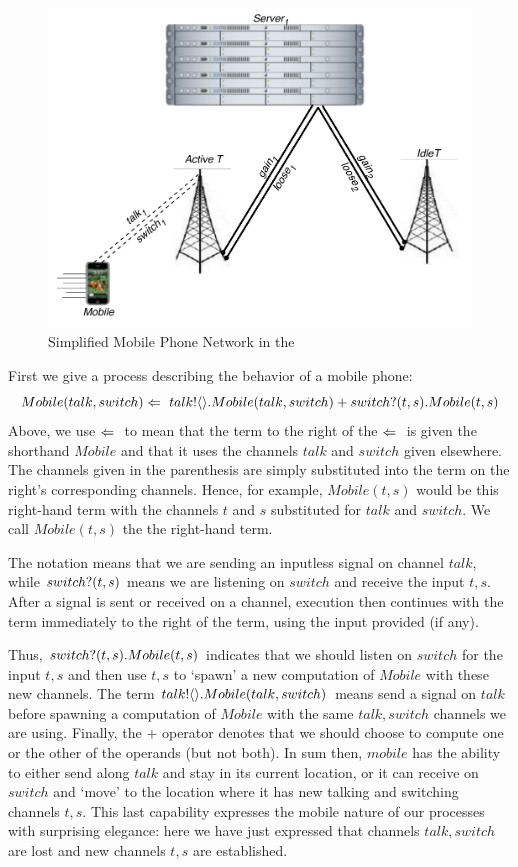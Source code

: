 	\begin{figure}[H]
	\centering
	\includegraphics[scale=0.7]{figures/cell_network_pi.pdf} %
	\caption{Simplified Mobile Phone Network in the \picalc}
	\label{fig_cell_network_pi}
	\end{figure}
	
	First we give a process describing the behavior of a mobile phone:
	\[
		Mobile(talk, switch) \Leftarrow\  {talk}!\langle{}\rangle. Mobile(talk,switch) + {switch}?({t,s}). Mobile(t,s)
	\]
	Above, we use $\Leftarrow\ $ to mean that the term to the right of the $\Leftarrow\ $ is given the shorthand $Mobile$ and that it uses the channels $talk$ and $switch$ given elsewhere.  The channels given in the parenthesis are simply substituted into the term on the right's corresponding channels.  Hence, for example, $Mobile(t,s)$ would be this right-hand term with the channels $t$ and $s$ substituted for $talk$ and $switch$. We call $Mobile(t,s)$ the  the right-hand term.
	
	The notation  means that we are sending an inputless signal on channel $talk$, while ${switch}?({t,s})$ means we are listening on $switch$ and receive the input $t,s$.  After a signal is sent or received on a channel, execution then continues with the term immediately to the right of the term, using the input provided (if any).  
	
	Thus, ${switch}?({t,s}). Mobile(t,s)$ indicates that we should listen on $switch$ for the input $t,s$ and then use $t,s$ to `spawn' a new computation of $Mobile$ with these new channels. The term ${talk}!\langle{}\rangle. Mobile(talk,switch)$ means send a signal on $talk$ before spawning a computation of $Mobile$ with the same $talk,switch$ channels we are using.  Finally, the $+$ operator denotes that we should choose to compute one or the other of the operands (but not both).  In sum then, $mobile$ has the ability to either send along $talk$ and stay in its current location, or it can receive on $switch$ and `move' to the location where it has new talking and switching channels $t,s$.  This last capability expresses the mobile nature of our processes with surprising elegance: here we have just expressed that channels $talk,switch$ are lost and new channels $t,s$ are established.
	
